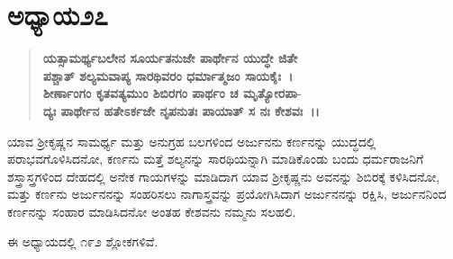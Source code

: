 \section*{ಅಧ್ಯಾಯ\enginline{-}೨೭}

\begin{verse}
\textbf{ಯತ್ಸಾಮರ್ಥ್ಯಬಲೇನ ಸೂರ್ಯತನುಜೇ ಪಾರ್ಥೇನ ಯುದ್ಧೇ ಜಿತೇ}\\\textbf{ಪಶ್ಚಾತ್ ಶಲ್ಯಮವಾಪ್ಯ ಸಾರಥಿವರಂ ಧರ್ಮಾತ್ಮಜಂ ಸಾಯಕೈಃ~।}\\\textbf{ಶೀರ್ಣಾಂಗಂ ಕೃತವತ್ಯಮುಂ ಶಿಬಿರಗಂ ಪಾರ್ಥಂ ಚ ಮೃತ್ಯೋರಪಾ}-\\\textbf{ದ್ಯಃ ಪಾರ್ಥೇನ ಹತೇಽರ್ಕಜೇ ನೃಪನುತಃ ಪಾಯಾತ್ ಸ ನಃ ಕೇಶವಃ~।।}
\end{verse}

ಯಾವ ಶ‍್ರೀಕೃಷ್ಣನ ಸಾಮರ್ಥ್ಯ ಮತ್ತು ಅನುಗ್ರಹ ಬಲಗಳಿಂದ ಅರ್ಜುನನು ಕರ್ಣನನ್ನು ಯುದ್ಧದಲ್ಲಿ ಪರಾಭವಗೊಳಿಸಿದನೋ, ಕರ್ಣನು ಮತ್ತೆ ಶಲ್ಯನನ್ನು ಸಾರಥಿಯನ್ನಾಗಿ ಮಾಡಿಕೊಂಡು ಬಂದು ಧರ್ಮರಾಜನಿಗೆ ಶಸ್ತ್ರಾಸ್ತ್ರಗಳಿಂದ ದೇಹದಲ್ಲಿ ಅನೇಕ ಗಾಯಗಳನ್ನು ಮಾಡಿದಾಗ ಯಾವ ಶ‍್ರೀಕೃಷ್ಣನು ಅವನನ್ನು ಶಿಬಿರಕ್ಕೆ ಕಳಿಸಿದನೋ, ಮತ್ತು ಕರ್ಣನು ಅರ್ಜುನನನ್ನು ಸಂಹರಿಸಲು ನಾಗಾಸ್ತ್ರವನ್ನು ಪ್ರಯೋಗಿಸಿದಾಗ ಅರ್ಜುನನನ್ನು ರಕ್ಷಿಸಿ, ಅರ್ಜುನನಿಂದ ಕರ್ಣನನ್ನು ಸಂಹಾರ ಮಾಡಿಸಿದನೋ ಅಂತಹ ಕೇಶವನು ನಮ್ಮನು ಸಲಹಲಿ.

ಈ ಅಧ್ಯಾಯದಲ್ಲಿ ೧೯೨ ಶ್ಲೋಕಗಳಿವೆ.

